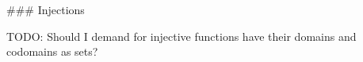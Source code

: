 \begin{code}%
%
\>[2]\<%
\\
\>[2][@{}l@{\AgdaIndent{0}}]%
\>[4]\AgdaSymbol{:}\AgdaSpace{}%
\AgdaSymbol{\{}\AgdaSpace{}%
\AgdaSymbol{:}\AgdaSpace{}%
\AgdaSpace{}%
\AgdaSymbol{\}\{}\AgdaSpace{}%
\AgdaSymbol{:}\AgdaSpace{}%
\AgdaSpace{}%
\AgdaSymbol{\}}\<%
\\
%
\>[4]\AgdaSpace{}%
\AgdaSymbol{(}\AgdaSpace{}%
\AgdaSymbol{:}\AgdaSpace{}%
\AgdaSpace{}%
\AgdaSpace{}%
\AgdaSymbol{)}\<%
\\
%
\>[4]\AgdaComment{---------------}\<%
\\
%
\>[4]\AgdaSpace{}%
\AgdaSpace{}%
\AgdaSymbol{(}\AgdaSpace{}%
\AgdaSpace{}%
\AgdaSymbol{)}\<%
\\
%
\\[\AgdaEmptyExtraSkip]%
%
\>[2]\AgdaSpace{}%
\AgdaSymbol{\{}\AgdaSpace{}%
\AgdaSymbol{=}\AgdaSpace{}%
\AgdaSymbol{\}}\AgdaSpace{}%
\AgdaSpace{}%
\AgdaSymbol{=}\<%
\\
\>[2][@{}l@{\AgdaIndent{0}}]%
\>[4]\AgdaSpace{}%
\AgdaSymbol{\{}\AgdaSpace{}%
\AgdaSpace{}%
\AgdaSymbol{:}\AgdaSpace{}%
\AgdaSymbol{\}}\AgdaSpace{}%
\AgdaSpace{}%
\AgdaSpace{}%
\AgdaSymbol{(}\AgdaSpace{}%
\AgdaSpace{}%
\AgdaSymbol{\{}\AgdaSymbol{\}\{}\AgdaSymbol{\})}\<%
\end{code}

### Injections

TODO: Should I demand for injective functions have their domains and codomains as sets?

